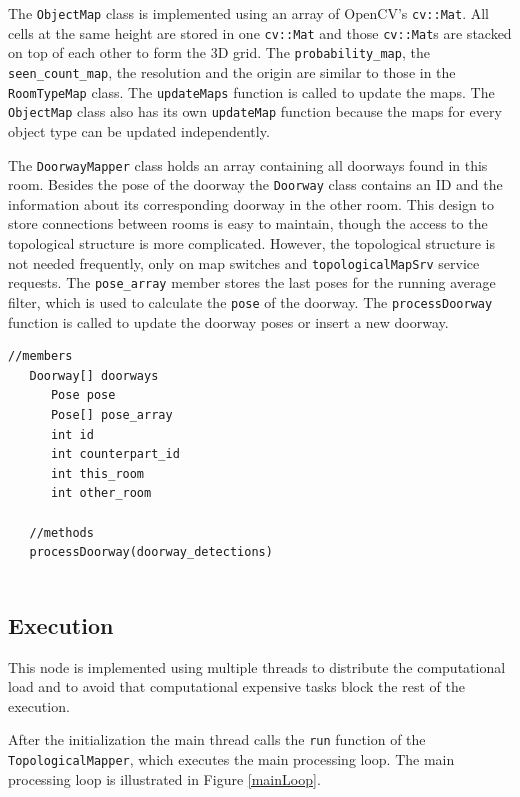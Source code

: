 The \texttt{ObjectMap} class is implemented using an array of OpenCV's \texttt{cv::Mat}. All cells at the same height are stored in one \texttt{cv::Mat} and those \texttt{cv::Mat}s are stacked on top of each other to form the 3D grid. The \texttt{probability{\_}map}, the \texttt{seen{\_}count{\_}map}, the resolution and the origin are similar to those in the \texttt{RoomTypeMap} class. The \texttt{updateMaps} function is called to update the maps. The \texttt{ObjectMap} class also has its own \texttt{updateMap} function because the maps for every object type can be updated independently.

The \texttt{DoorwayMapper} class holds an array containing all doorways found in this room. Besides the pose of the doorway the \texttt{Doorway} class contains an ID and the information about its corresponding doorway in the other room. This design to store connections between rooms is easy to maintain, though the access to the topological structure is more complicated. However, the topological structure is not needed frequently, only on map switches and \texttt{topologicalMapSrv} service requests. The \texttt{pose{\_}array} member stores the last poses for the running average filter, which is used to calculate the \texttt{pose} of the doorway. The \texttt{processDoorway} function is called to update the doorway poses or insert a new doorway.

\begin{minipage}{\linewidth}
\begin{lstlisting}[caption=\texttt{DoorwayMapper} class and nested \texttt{Doorway} class,frame=single, label=DoorwayMapper]
   //members
   Doorway[] doorways
      Pose pose
      Pose[] pose_array
      int id
      int counterpart_id
      int this_room
      int other_room
   
   //methods
   processDoorway(doorway_detections)
   
\end{lstlisting}
\end{minipage} 


\subsection{Execution} \label{exec_impl}

This node is implemented using multiple threads to distribute the computational load and to avoid that computational expensive tasks block the rest of the execution. 

After the initialization the main thread calls the \texttt{run} function of the \linebreak \texttt{TopologicalMapper}, which executes the main processing loop. The main processing loop is illustrated in Figure \ref{mainLoop}.


